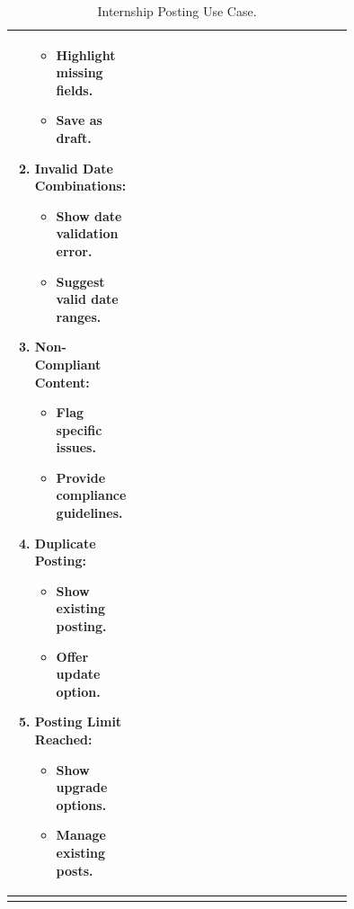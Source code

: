 \begin{center}
\begin{longtable}{|l|p{0.75\linewidth}|}
\begin{enumerate}
\begin{itemize}
                \item Highlight missing fields.
                \item Save as draft.
            \end{itemize} 
            \item \textbf{Invalid Date Combinations:} 
            \begin{itemize}
                \item Show date validation error.
                \item Suggest valid date ranges.
            \end{itemize} 
            \item \textbf{Non-Compliant Content:} 
            \begin{itemize}
                \item Flag specific issues.
                \item Provide compliance guidelines.
            \end{itemize} 
            \item \textbf{Duplicate Posting:} 
            \begin{itemize}
                \item Show existing posting.
                \item Offer update option.
            \end{itemize} 
            \item \textbf{Posting Limit Reached:} 
            \begin{itemize}
                \item Show upgrade options.
                \item Manage existing posts.
            \end{itemize} 
        \end{enumerate} \\
        \hline
        \caption{Internship Posting Use Case.}
        \label{tab:internship_posting_use_case}
    \end{longtable}
\end{center}

